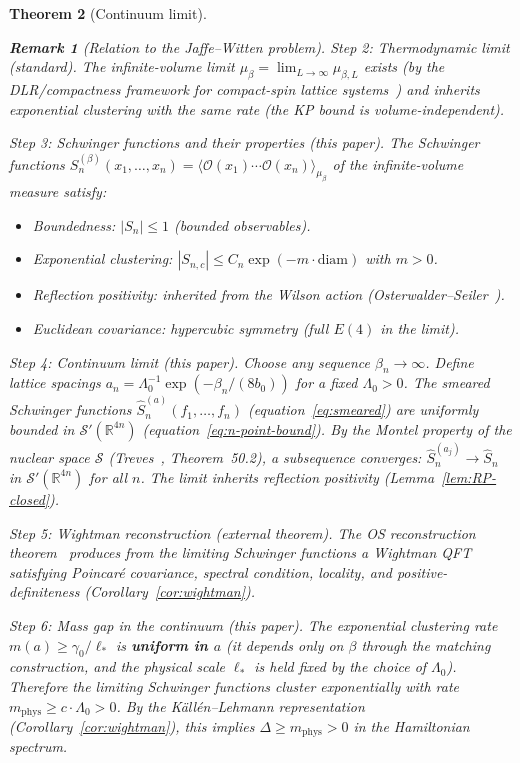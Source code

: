 \documentclass[11pt]{article}
\newtheorem{theorem}{Theorem}[section]
\theoremstyle{definition}
\newtheorem{remark}[theorem]{Remark}
\newcommand{\R}{\mathbb{R}}
\begin{document}
\begin{theorem}[Continuum limit]
\begin{remark}[Relation to the Jaffe--Witten problem]
\emph{Step 2: Thermodynamic limit (standard).}
The infinite-volume limit $\mu_{\beta}=\lim_{L\to\infty}
\mu_{\beta,L}$ exists (by the DLR/compactness framework
for compact-spin lattice systems~\cite{GlimmJaffe})
and inherits exponential clustering with the same rate
(the KP bound is volume-independent).

\emph{Step 3: Schwinger functions and their properties (this paper).}
The Schwinger functions $S_n^{(\beta)}(x_1,\ldots,x_n)
=\langle\mathcal{O}(x_1)\cdots\mathcal{O}(x_n)\rangle_{\mu_\beta}$
of the infinite-volume measure satisfy:
\begin{itemize}[nosep]
\item Boundedness: $|S_n|\le 1$ (bounded observables).
\item Exponential clustering:
$|S_{n,c}|\le C_n\exp(-m\cdot\mathrm{diam})$ with $m>0$.
\item Reflection positivity: inherited from the Wilson action
(Osterwalder--Seiler~\cite{OS78}).
\item Euclidean covariance: hypercubic symmetry
(full $E(4)$ in the limit).
\end{itemize}

\emph{Step 4: Continuum limit (this paper).}
Choose \emph{any} sequence $\beta_n\to\infty$.
Define lattice spacings $a_n=\Lambda_0^{-1}
\exp(-\beta_n/(8b_0))$ for a fixed $\Lambda_0>0$.
The smeared Schwinger functions
$\hat S_n^{(a)}(f_1,\ldots,f_n)$ (equation~\eqref{eq:smeared})
are uniformly bounded in $\mathcal{S}'(\R^{4n})$
(equation~\eqref{eq:n-point-bound}).
By the Montel property of the nuclear space $\mathcal{S}$
(Treves~\cite{Treves}, Theorem~50.2),
a subsequence converges: $\hat S_n^{(a_j)}\to\hat S_n$
in $\mathcal{S}'(\R^{4n})$ for all $n$.
The limit inherits reflection positivity
(Lemma~\ref{lem:RP-closed}).

\emph{Step 5: Wightman reconstruction (external theorem).}
The OS reconstruction theorem~\cite{OS73} produces from
the limiting Schwinger functions a Wightman QFT satisfying
Poincar\'e covariance, spectral condition, locality, and
positive-definiteness (Corollary~\ref{cor:wightman}).

\emph{Step 6: Mass gap in the continuum (this paper).}
The exponential clustering rate $m(a)\ge\gamma_0/\ell_*$
is \textbf{uniform in $a$} (it depends only on $\beta$
through the matching construction, and the physical scale
$\ell_*$ is held fixed by the choice of $\Lambda_0$).
Therefore the limiting Schwinger functions cluster
exponentially with rate $m_{\mathrm{phys}}\ge c\cdot\Lambda_0>0$.
By the K\"all\'en--Lehmann representation
(Corollary~\ref{cor:wightman}), this implies
$\Delta\ge m_{\mathrm{phys}}>0$ in the Hamiltonian spectrum.


\end{remark}
\end{theorem}
\end{document}
